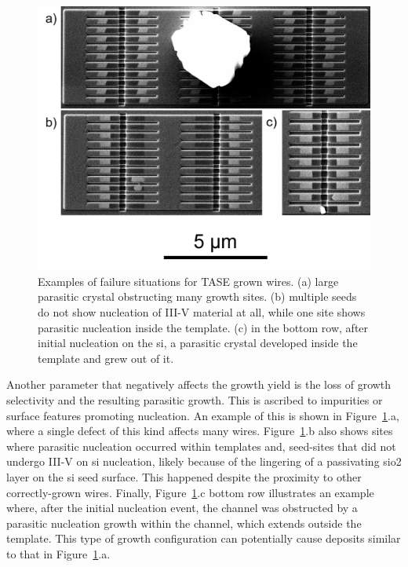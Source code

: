 \begin{figure}
    \centering
    \includegraphics[width=\columnwidth]{4_Properties/From_Article2/Figure3.png}
    \caption{Examples of failure situations for TASE grown wires. (a) large parasitic crystal obstructing many growth sites. (b) multiple seeds do not show nucleation of III-V material at all, while one site shows parasitic nucleation inside the template. (c) in the bottom row, after initial nucleation on the \acs{si}, a parasitic crystal developed inside the template and grew out of it.}
    \label{fig:failures}
\end{figure}

Another parameter that negatively affects the growth yield is the loss of growth selectivity and the resulting parasitic growth. This is ascribed to impurities or surface features promoting nucleation. An example of this is shown in Figure~\ref{fig:failures}.a, where a single defect of this kind affects many wires. Figure~\ref{fig:failures}.b also shows sites where parasitic nucleation occurred within templates and, seed-sites that did not undergo III-V on \acs{si} nucleation, likely because of the lingering of a passivating \acs{sio2} layer on the \acs{si} seed surface. This happened despite the proximity to other correctly-grown wires. Finally, 
Figure~\ref{fig:failures}.c bottom row illustrates an example where, after the initial nucleation event, the channel was obstructed by a parasitic nucleation growth within the channel, which extends outside the template. This type of growth configuration can potentially cause deposits similar to that in Figure~\ref{fig:failures}.a.

